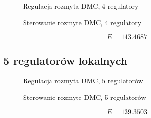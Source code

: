\begin{figure}[H]
\centering

\caption{Regulacja rozmyta DMC, 4 regulatory}
\end{figure}

\begin{figure}[H]
\centering

\caption{Sterowanie rozmyte DMC, 4 regulatory}
\end{figure}

\begin{equation}
    E = \num{143,4687}
\end{equation}

\subsection{5 regulatorów lokalnych}

\begin{figure}[H]
\centering

\caption{Regulacja rozmyta DMC, 5 regulatorów}
\end{figure}

\begin{figure}[H]
\centering

\caption{Sterowanie rozmyte DMC, 5 regulatorów}
\end{figure}

\begin{equation}
    E = \num{139,3503}
\end{equation}